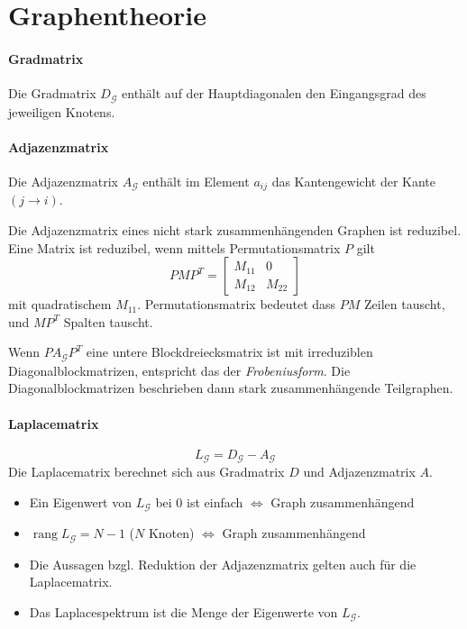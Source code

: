 \section{Graphentheorie}
\paragraph{Gradmatrix}
Die Gradmatrix $D_\mathcal{G}$ enthält auf der Hauptdiagonalen den Eingangsgrad des jeweiligen Knotens.

\paragraph{Adjazenzmatrix}
Die Adjazenzmatrix $A_\mathcal{G}$ enthält im Element $a_{ij}$
das Kantengewicht der Kante $(j \rightarrow i)$.

Die Adjazenzmatrix eines nicht stark zusammenhängenden Graphen ist reduzibel.
Eine Matrix ist reduzibel, wenn mittels Permutationsmatrix $P$ gilt
\begin{equation}
    PMP^T = \begin{bmatrix}
        M_{11} & 0 \\
        M_{12} & M_{22}
    \end{bmatrix}
\end{equation}
mit quadratischem $M_{11}$.
Permutationsmatrix bedeutet dass $PM$ Zeilen tauscht, und $MP^T$ Spalten tauscht.

Wenn $PA_\mathcal{G}P^T$ eine untere Blockdreiecksmatrix ist mit irreduziblen
Diagonalblockmatrizen, entspricht das der \emph{Frobeniusform}.
Die Diagonalblockmatrizen beschrieben dann stark zusammenhängende Teilgraphen.


\paragraph{Laplacematrix}
\begin{equation}
    \tag{Laplacematrix}
    L_\mathcal{G} = D_\mathcal{G} - A_\mathcal{G}
    \label{eqn:laplace_matrix}
\end{equation}
Die Laplacematrix berechnet sich aus Gradmatrix $D$ und
Adjazenzmatrix $A$.

\begin{itemize}
    \item Ein Eigenwert von $L_\mathcal{G}$ bei 0 ist einfach $\iff$ Graph zusammenhängend
    \item $\operatorname{rang} L_\mathcal{G} = N-1$ ($N$ Knoten) $\iff$ Graph zusammenhängend
    \item Die Aussagen bzgl. Reduktion der Adjazenzmatrix gelten auch für die Laplacematrix.
    \item Das Laplacespektrum ist die Menge der Eigenwerte von $L_\mathcal{G}$.
\end{itemize}

